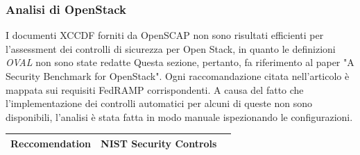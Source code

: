 \documentclass[../main.tex]{subfiles}
\begin{document}
\subsubsection{Analisi di OpenStack}
I documenti XCCDF forniti da OpenSCAP non sono risultati efficienti per l'assessment dei controlli di sicurezza per Open Stack, in quanto le definizioni \textit{OVAL} non sono state redatte
Questa sezione, pertanto, fa riferimento al paper "A Security Benchmark for OpenStack". Ogni raccomandazione citata nell'articolo è mappata sui requisiti FedRAMP corrispondenti. A causa del fatto che l'implementazione dei controlli automatici per alcuni di queste non sono disponibili, l'analisi è stata fatta in modo manuale ispezionando le configurazioni.
\begin{table}[h]
    \begin{tabulary}{\textwidth}{|c|c|c|}
    \hline
    Reccomendation & NIST Security Controls & \\ \hline


\end{tabulary}
\end{table}
\end{document}
